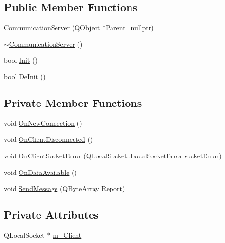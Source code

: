 \subsection*{Public Member Functions}
\begin{DoxyCompactItemize}
\item 
\hyperlink{class_r_w_1_1_c_o_r_e_1_1_communication_server_a8b4be098b0e453dd10e717788dfd12b6}{Communication\+Server} (Q\+Object $\ast$Parent=nullptr)
\item 
\hyperlink{class_r_w_1_1_c_o_r_e_1_1_communication_server_a924f4957db6e0ae05d20520cdbc7e775}{$\sim$\+Communication\+Server} ()
\item 
bool \hyperlink{class_r_w_1_1_c_o_r_e_1_1_communication_server_a202a8635256a2ce503019a664917b095}{Init} ()
\item 
bool \hyperlink{class_r_w_1_1_c_o_r_e_1_1_communication_server_ac7b0fd62b6071c494f132e1a9e312604}{De\+Init} ()
\end{DoxyCompactItemize}
\subsection*{Private Member Functions}
\begin{DoxyCompactItemize}
\item 
void \hyperlink{class_r_w_1_1_c_o_r_e_1_1_communication_server_ad26258ff2481b68cec6d80e78e0a5c7d}{On\+New\+Connection} ()
\item 
void \hyperlink{class_r_w_1_1_c_o_r_e_1_1_communication_server_ae204445cecf0ff7a01409bd34a127f61}{On\+Client\+Disconnected} ()
\item 
void \hyperlink{class_r_w_1_1_c_o_r_e_1_1_communication_server_a1d852ba8f1b04e0e2e49b369c0f1d32d}{On\+Client\+Socket\+Error} (Q\+Local\+Socket\+::\+Local\+Socket\+Error socket\+Error)
\item 
void \hyperlink{class_r_w_1_1_c_o_r_e_1_1_communication_server_abdbb4f3eeced8215b50e75fdd93d62af}{On\+Data\+Available} ()
\item 
void \hyperlink{class_r_w_1_1_c_o_r_e_1_1_communication_server_a731de143323e7949781411506ed57891}{Send\+Message} (Q\+Byte\+Array Report)
\end{DoxyCompactItemize}
\subsection*{Private Attributes}
\begin{DoxyCompactItemize}
\item 
Q\+Local\+Socket $\ast$ \hyperlink{class_r_w_1_1_c_o_r_e_1_1_communication_server_a00d7ca97061231176a915058cf71d794}{m\+\_\+\+Client}
\end{DoxyCompactItemize}


